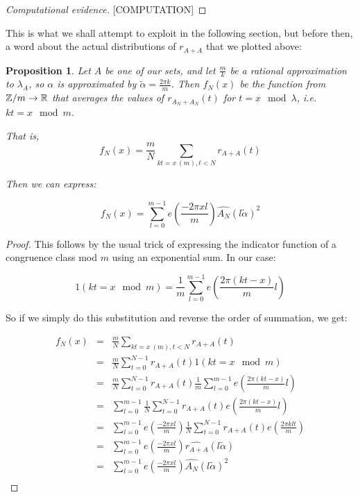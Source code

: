 \documentclass{report}
\newtheorem{proposition}[theorem]{Proposition}
\theoremstyle{remark}
\numberwithin{equation}{section}
\begin{document}
\begin{proof}[Computational evidence]

{\color{red}[COMPUTATION]}

\end{proof}

This is what we shall attempt to exploit in the following section, but
before then, a word about the actual distributions of $r_{A+A}$ that
we plotted above: 

\begin{proposition}
  Let $A$ be one of our \relevant sets, and let $\frac{m}{k}$ be a
  rational approximation to $\lambda_A$, so $\alpha$ is approximated
  by $\widetilde{\alpha} = \frac{2\pi k}{m}$.  Then $f_N(x)$ be the
  function from $\mathbb{Z}/m \to \mathbb{R}$ that averages the values of
  $r_{A_N+A_N}(t)$ for $t = x \mod{\lambda}$, i.e. $kt = x \mod{m}$.

  That is, 
  \[f_N(x) = \frac{m}{N} \sum_{kt = x\ \!(m), t < N} r_{A+A}(t)\]

  Then we can express: 

  \[f_N(x) = \sum_{l=0}^{m-1} e(\frac{-2\pi x l}{m}) \widehat{A_N}(l\widetilde{\alpha})^2\]
\end{proposition}

\begin{proof}

This follows by the usual trick of expressing the indicator function
of a congruence class mod $m$ using an exponential sum.  In our case: 


\[1(kt = x\!\!\!\!\mod{m}) = \frac{1}{m}\sum_{l=0}^{m-1} e(\frac{2\pi
    (kt-x)}{m}l)\]

So if we simply do this substitution and reverse the order of
summation, we get: 

\begin{eqnarray*}
  f_N(x) &=& \frac{m}{N} \sum_{kt = x\ \!(m), t < N} r_{A+A}(t)\\
         &=& \frac{m}{N} \sum_{t = 0}^{N-1} r_{A+A}(t)1(kt = x\!\!\!\!\mod{m})\\
         &=& \frac{m}{N} \sum_{t = 0}^{N-1}
             r_{A+A}(t)\frac{1}{m}\sum_{l=0}^{m-1} e(\frac{2\pi (kt-x)}{m}l)\\
         &=& \sum_{l=0}^{m-1} \frac{1}{N} \sum_{t = 0}^{N-1}
             r_{A+A}(t) e(\frac{2\pi (kt-x)}{m}l)\\
         &=& \sum_{l=0}^{m-1} e(\frac{-2\pi x l}{m}) \frac{1}{N} \sum_{t = 0}^{N-1}
             r_{A+A}(t) e(\frac{2\pi klt}{m})\\
         &=& \sum_{l=0}^{m-1} e(\frac{-2\pi x l}{m}) \widehat{r_{A+A}}(l\widetilde{\alpha})\\
         &=& \sum_{l=0}^{m-1} e(\frac{-2\pi x l}{m}) \widehat{A_N}(l\widetilde{\alpha})^2\\
\end{eqnarray*}

\end{proof}
\end{document}
